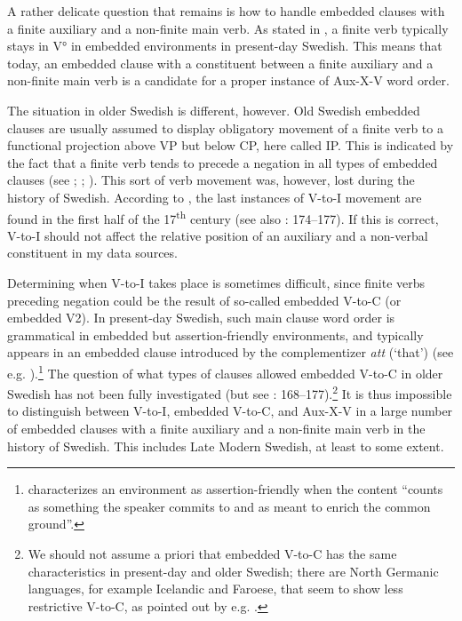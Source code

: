 \documentclass[output=paper, colorlinks, citecolor=brown]{langscibook}
\begin{document}
A rather delicate question that remains is how to handle embedded clauses with a finite auxiliary and a non-finite main verb. As stated in , a finite verb typically stays in V° in embedded environments in present-day Swedish. This means that today, an embedded clause with a constituent between a finite auxiliary and a non-finite main verb is a candidate for a proper instance of Aux-X-V word order.


The situation in older Swedish is different, however. Old Swedish embedded clauses are usually assumed to display obligatory movement of a finite verb to a functional projection above VP but below CP, here called IP. This is indicated by the fact that a finite verb tends to precede a negation in all types of embedded clauses (see \citealt{Platzack1988emergence}; \citealt{Falk1993}; \citealt{Hakansson2013}). This sort of verb movement was, however, lost during the history of Swedish. According to \citet{Platzack1988emergence}, the last instances of V-to-I movement are found in the first half of the 17\textsuperscript{th} century (see also \citealt{Falk1993}: 174–177). If this is correct, V-to-I should not affect the relative position of an auxiliary and a non-verbal constituent in my data sources.



Determining when V-to-I takes place is sometimes difficult, since finite verbs preceding negation could be the result of so-called embedded V-to-C (or embedded V2). In present-day Swedish, such main clause word order is grammatical in embedded but assertion-friendly environments, and typically appears in an embedded clause introduced by the complementizer \textit{att} (‘that’) (see e.g. \citealt{Petersson2014}).\footnote{\citet[4]{Gartner2016} characterizes an environment as assertion-friendly when the content “counts as something the speaker commits to and as meant to enrich the common ground”.} The question of what types of clauses allowed embedded V-to-C in older Swedish has not been fully investigated (but see \citealt{Falk1993}: 168–177).\footnote{We should not assume a priori that embedded V-to-C has the same characteristics in present-day and older Swedish; there are North Germanic languages, for example Icelandic and Faroese, that seem to show less restrictive V-to-C, as pointed out by e.g. \citet{Gartner2016}.} It is thus impossible to distinguish between V-to-I, embedded V-to-C, and Aux-X-V in a large number of embedded clauses with a finite auxiliary and a non-finite main verb in the history of Swedish. This includes Late Modern Swedish, at least to some extent.
\end{document}
